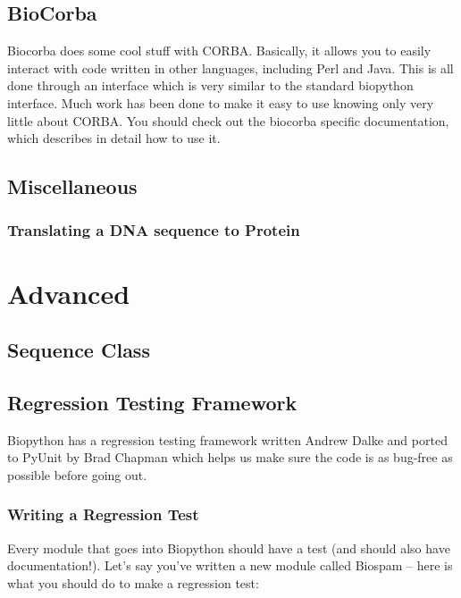 \documentclass{report}
\begin{document}
\section{BioCorba}

Biocorba does some cool stuff with CORBA. Basically, it allows you to easily interact with code written in other languages, including Perl and Java. This is all done through an interface which is very similar to the standard biopython interface. Much work has been done to make it easy to use knowing only very little about CORBA. You should check out the biocorba specific documentation, which describes in detail how to use it.


\section{Miscellaneous}

\subsection{Translating a DNA sequence to Protein}

\chapter{Advanced}

\section{Sequence Class}

\section{Regression Testing Framework}
\label{sec:regr_test}

Biopython has a regression testing framework written Andrew Dalke and ported to PyUnit by Brad Chapman which helps us make sure the code is as bug-free as possible before going out.

\subsection{Writing a Regression Test}

Every module that goes into Biopython should have a test (and should also have documentation!). Let's say you've written a new module called Biospam -- here is what you should do to make a regression test:
\end{document}
